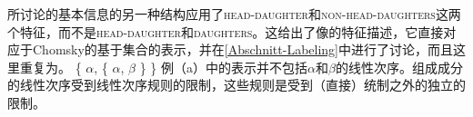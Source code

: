 \noindent
\citet[\S~9]{ps2}所讨论的基本信息的另一种结构应用了\textsc{head-daughter}和\textsc{non-head-daughters}这两个特征，而不是\textsc{head-daughter}和\textsc{daughters}。这给出了像的特征描述，它直接对应于Chomsky的基于集合的表示，并在\ref{Abschnitt-Labeling}中进行了讨论，而且这里重复为。
\eal
\ex {}
\ex \{ $\alpha$, \{ $\alpha$, $\beta$ \} \}
\zl
例（a）中的表示并不包括$\alpha$和$\beta$的线性次序。组成成分的线性次序受到线性次序规则的限制，这些规则是受到（直接）统制之外的独立的限制。

